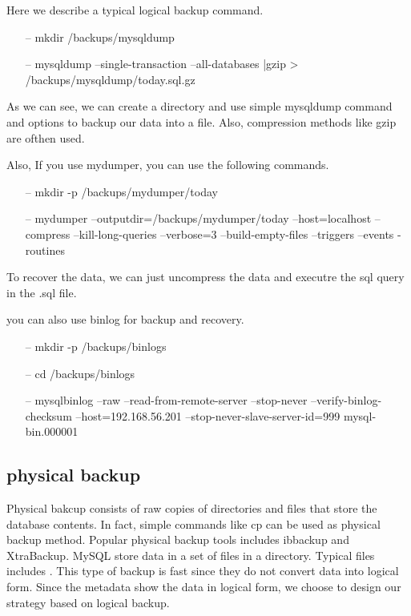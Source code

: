 Here we describe a typical logical backup command.


\begin{itemize}
\item[--] mkdir /backups/mysqldump
\item[--] mysqldump --single-transaction --all-databases |gzip > /backups/mysqldump/today.sql.gz 
\end{itemize}


                                                 

As we can see, we can create a directory and use simple mysqldump command and options to backup our data into a file. Also, compression methods like gzip are ofthen used.

Also, If you use mydumper, you can use the following commands.

\begin{itemize}
\item[--] mkdir -p /backups/mydumper/today
\item[--] mydumper --outputdir=/backups/mydumper/today --host=localhost --compress --kill-long-queries --verbose=3 --build-empty-files --triggers --events -routines 
\end{itemize}

 
To recover the data, we can just uncompress the data and executre the sql query in the .sql file. 

you can also use binlog for backup and recovery.

\begin{itemize}
\item[--] mkdir -p /backups/binlogs
\item[--] cd /backups/binlogs
\item[--] mysqlbinlog --raw --read-from-remote-server --stop-never --verify-binlog-checksum --host=192.168.56.201 --stop-never-slave-server-id=999 mysql-bin.000001
\end{itemize}


\subsection{physical backup}

Physical bakcup consists of raw copies of directories and files that store the database contents\citep{mysqlbackupdocumentation}. In fact, simple commands like cp can be used as physical backup method. Popular physical backup tools includes ibbackup and XtraBackup\citep{xtrabackup}. MySQL store data in a set of files in a directory. Typical files includes .
This type of backup is fast since they do not convert data into logical form. Since the metadata show the data in logical form, we choose to design our strategy based on logical backup. 


